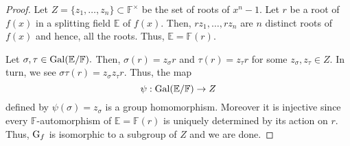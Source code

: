 \nthrootsnonunity*\label{prop:nthrootsnonunity2}
\begin{flushright}\hyperref[prop:nthrootsnonunity]{\upsym}\end{flushright}
\begin{proof}
    Let $Z = \{z_1, \ldots, z_n\} \subset \mathbb{F}^\times$ be the set of roots of $x^n - 1.$ Let $r$ be a root of $f(x)$ in a splitting field $\mathbb{E}$ of $f(x).$ Then, $rz_1, \ldots, rz_n$ are $n$ distinct roots of $f(x)$ and hence, all the roots. Thus, $\mathbb{E} = \mathbb{F}(r).$

    Let $\sigma, \tau \in \operatorname{Gal}(\mathbb{E}/\mathbb{F}).$ Then, $\sigma(r) = z_{\sigma}r$ and $\tau(r) = z_{\tau}r$ for some $z_\sigma, z_\tau \in Z.$ In turn, we see $\sigma\tau(r) = z_{\sigma}z_{\tau}r.$ Thus, the map
    \begin{equation*} 
        \psi : \operatorname{Gal}(\mathbb{E}/\mathbb{F}) \to Z
    \end{equation*}
    defined by $\psi(\sigma) = z_{\sigma}$ is a group homomorphism. Moreover it is injective since every $\mathbb{F}$-automorphism of $\mathbb{E} = \mathbb{F}(r)$ is uniquely determined by its action on $r.$ Thus, $\operatorname{G}_f$ is isomorphic to a subgroup of $Z$ and we are done.
\end{proof}


